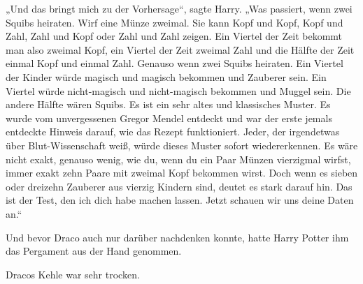 „Und das bringt mich zu der Vorhersage“, sagte Harry.
„Was passiert, wenn zwei Squibs heiraten. Wirf eine Münze zweimal. Sie kann Kopf und Kopf, Kopf und Zahl, Zahl und Kopf oder Zahl und Zahl zeigen. Ein Viertel der Zeit bekommt man also zweimal Kopf, ein Viertel der Zeit zweimal Zahl und die Hälfte der Zeit einmal Kopf und einmal Zahl. Genauso wenn zwei Squibs heiraten. Ein Viertel der Kinder würde magisch und magisch bekommen und Zauberer sein. Ein Viertel würde nicht-magisch und nicht-magisch bekommen und Muggel sein. Die andere Hälfte wären Squibs. Es ist ein sehr altes und klassisches Muster. Es wurde vom unvergessenen Gregor Mendel entdeckt und war der erste jemals entdeckte Hinweis darauf, wie das Rezept funktioniert. Jeder, der irgendetwas über Blut-Wissenschaft weiß, würde dieses Muster sofort wiedererkennen. Es wäre nicht exakt, genauso wenig, wie du, wenn du ein Paar Münzen vierzigmal wirfst, immer exakt zehn Paare mit zweimal Kopf bekommen wirst. Doch wenn es sieben oder dreizehn Zauberer aus vierzig Kindern sind, deutet es stark darauf hin. Das ist der Test, den ich dich habe machen lassen. Jetzt schauen wir uns deine Daten an.“

Und bevor Draco auch nur darüber nachdenken konnte, hatte Harry Potter ihm das Pergament aus der Hand genommen.

Dracos Kehle war sehr trocken.

